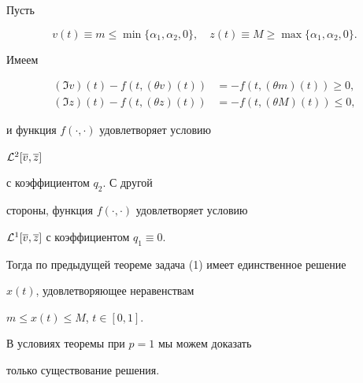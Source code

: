 \begin{pf} Пусть


$$


v(t)\equiv m\le\min\{\alpha_1,\alpha_2,0\},\quad


z(t)\equiv M\ge\max\{\alpha_1,\alpha_2,0\}.


$$





Имеем


\begin{align*}


(\Im v)(t)-f(t,(\theta v)(t))&=-f(t,(\theta m)(t))\ge 0, \\


(\Im z)(t)-f(t,(\theta z)(t))&=-f(t,(\theta M)(t))\le 0,


\end{align*}


и функция $f(\cdot,\cdot)$ удовлетворяет условию


${\cal L}^2[\overline {v},\overline {z}]$


с коэффициентом $q_2$. С другой


стороны, функция $f(\cdot,\cdot)$ удовлетворяет условию


${\cal L}^1[\overline {v},\overline {z}]$ с коэффициентом $q_1\equiv 0$.


Тогда по предыдущей теореме задача (1) имеет единственное решение


$x(t)$, удовлетворяющее неравенствам


$m\le x(t)\le M$, $t\in [0,1]$.


\end{pf}





\begin{note} В условиях теоремы при $p=1$ мы можем доказать


только существование решения.


\end{note}





